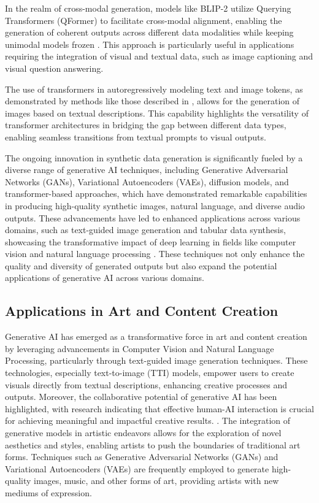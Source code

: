 In the realm of cross-modal generation, models like BLIP-2 utilize Querying Transformers (QFormer) to facilitate cross-modal alignment, enabling the generation of coherent outputs across different data modalities while keeping unimodal models frozen \cite{li2023blip}. This approach is particularly useful in applications requiring the integration of visual and textual data, such as image captioning and visual question answering.

The use of transformers in autoregressively modeling text and image tokens, as demonstrated by methods like those described in \cite{ramesh2021zero}, allows for the generation of images based on textual descriptions. This capability highlights the versatility of transformer architectures in bridging the gap between different data types, enabling seamless transitions from textual prompts to visual outputs.

The ongoing innovation in synthetic data generation is significantly fueled by a diverse range of generative AI techniques, including Generative Adversarial Networks (GANs), Variational Autoencoders (VAEs), diffusion models, and transformer-based approaches, which have demonstrated remarkable capabilities in producing high-quality synthetic images, natural language, and diverse audio outputs. These advancements have led to enhanced applications across various domains, such as text-guided image generation and tabular data synthesis, showcasing the transformative impact of deep learning in fields like computer vision and natural language processing \cite{koo2023comprehensivesurveygenerativediffusion,dhariwal2021diffusion,palmini2024patternscreativityuserinput}. These techniques not only enhance the quality and diversity of generated outputs but also expand the potential applications of generative AI across various domains.


\subsection{Applications in Art and Content Creation} \label{subsec:Applications in Art and Content Creation}

Generative AI has emerged as a transformative force in art and content creation by leveraging advancements in Computer Vision and Natural Language Processing, particularly through text-guided image generation techniques. These technologies, especially text-to-image (TTI) models, empower users to create visuals directly from textual descriptions, enhancing creative processes and outputs. Moreover, the collaborative potential of generative AI has been highlighted, with research indicating that effective human-AI interaction is crucial for achieving meaningful and impactful creative results. \cite{palmini2024patternscreativityuserinput}. The integration of generative models in artistic endeavors allows for the exploration of novel aesthetics and styles, enabling artists to push the boundaries of traditional art forms. Techniques such as Generative Adversarial Networks (GANs) and Variational Autoencoders (VAEs) are frequently employed to generate high-quality images, music, and other forms of art, providing artists with new mediums of expression.



